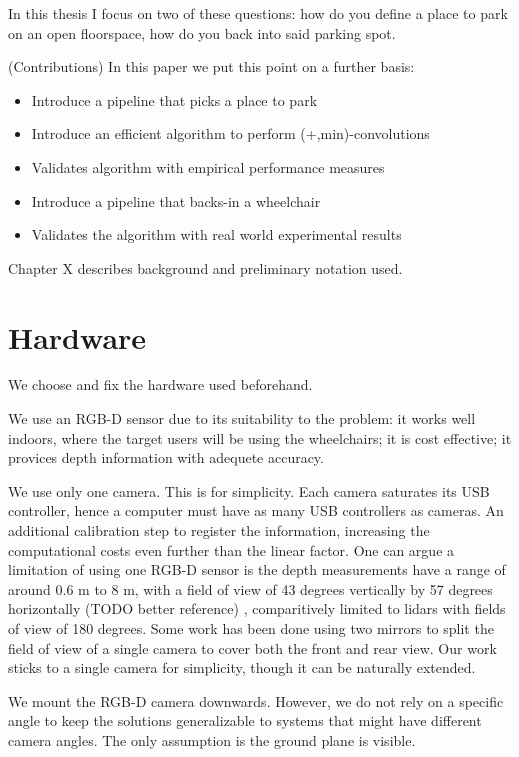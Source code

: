 In this thesis I focus on two of these questions: how do you define a place to
park on an open floorspace, how do you back into said parking spot.

(Contributions) In this paper we put this point on a further basis:
\begin{itemize}
\item Introduce a pipeline that picks a place to park
\item Introduce an efficient algorithm to perform (+,min)-convolutions
\item Validates algorithm with empirical performance measures
\item Introduce a pipeline that backs-in a wheelchair
\item Validates the algorithm with real world experimental results
\end{itemize}

Chapter X describes background and preliminary notation used.

\section{Hardware}
We choose and fix the hardware used beforehand.

We use an RGB-D sensor due to its suitability to the problem:
it works well indoors, where the target users will be using the wheelchairs; it
is cost effective; it provices depth information with adequete accuracy.

We use only one camera. This is for simplicity. Each camera saturates its USB
controller, hence a computer must have as many USB controllers as cameras.
An additional calibration step to register the information, increasing the
computational costs even further than the linear factor. 
One can argue a limitation of using one RGB-D sensor is the depth measurements
have a range of around 0.6 m to 8 m, with a field of view of 43 degrees
vertically by 57 degrees horizontally (TODO better reference) \cite{endres2014catadioptric},
comparitively limited to lidars with fields of view of 180 degrees. Some work
\cite{endres2014catadioptric} has been done using two mirrors to split the field
of view of a single camera to cover both the front and rear view. Our work
sticks to a single camera for simplicity, though it can be naturally extended.

We mount the RGB-D camera downwards. However, we do not rely on a specific angle
to keep the solutions generalizable to systems that might have different camera
angles. The only assumption is the ground plane is visible.

